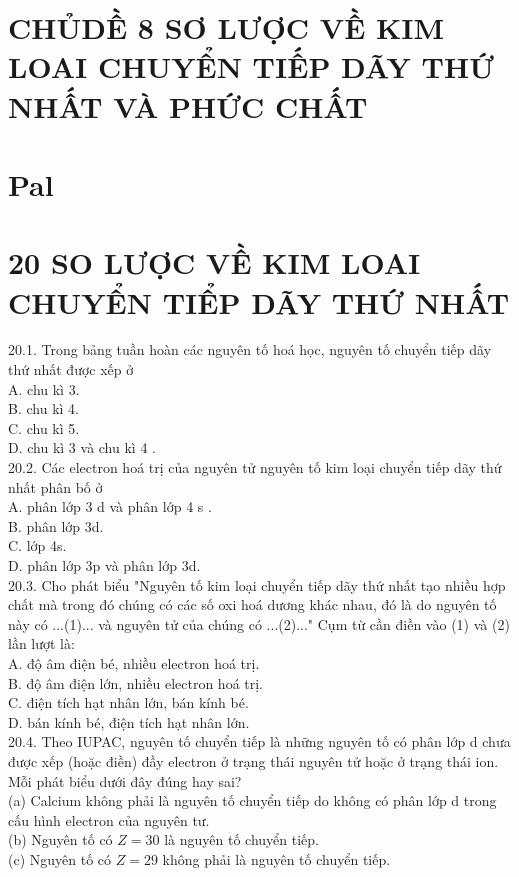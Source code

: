 \documentclass[10pt]{article}
\begin{document}
\section*{CHỦDỀ 8 SƠ LƯỢC VỀ KIM LOAI CHUYỂN TIẾP DÃY THỨ NHẤT VÀ PHỨC CHẤT}
\section*{Pal}
\section*{20 SO LƯỢC VỀ KIM LOAI CHUYỂN TIỂP DÃY THỨ NHẤT}
20.1. Trong bảng tuần hoàn các nguyên tố hoá học, nguyên tố chuyển tiếp dãy thứ nhất được xếp ở\\
A. chu kì 3.\\
B. chu kì 4.\\
C. chu kì 5.\\
D. chu kì 3 và chu kì 4 .\\
20.2. Các electron hoá trị của nguyên tử nguyên tố kim loại chuyển tiếp dãy thứ nhất phân bố ở\\
A. phân lớp 3 d và phân lớp 4 s .\\
B. phân lớp 3d.\\
C. lớp 4s.\\
D. phân lớp 3p và phân lớp 3d.\\
20.3. Cho phát biểu "Nguyên tố kim loại chuyển tiếp dãy thứ nhất tạo nhiều hợp chất mà trong đó chúng có các số oxi hoá dương khác nhau, đó là do nguyên tố này có ...(1)... và nguyên tử của chúng có ...(2)..." Cụm từ cần điền vào (1) và (2) lần lượt là:\\
A. độ âm điện bé, nhiều electron hoá trị.\\
B. độ âm điện lớn, nhiều electron hoá trị.\\
C. điện tích hạt nhân lớn, bán kính bé.\\
D. bán kính bé, điện tích hạt nhân lớn.\\
20.4. Theo IUPAC, nguyên tố chuyển tiếp là những nguyên tố có phân lớp d chưa được xếp (hoặc điền) đầy electron ở trạng thái nguyên tử hoặc ở trạng thái ion. Mỗi phát biểu dưới đây đúng hay sai?\\
(a) Calcium không phải là nguyên tố chuyển tiếp do không có phân lớp d trong cấu hình electron của nguyên tư.\\
(b) Nguyên tố có $Z=30$ là nguyên tố chuyển tiếp.\\
(c) Nguyên tố có $Z=29$ không phải là nguyên tố chuyển tiếp.\\
\end{document}
